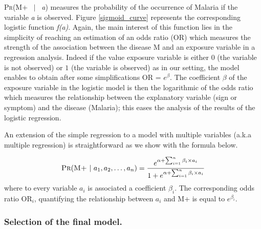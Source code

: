 \textsc{Pr}(\textsc{M+} ~$|$~ \emph{a}) measures the probability of the occurrence of Malaria if the variable \emph{a} is observed.
Figure \ref{sigmoid_curve} represents the corresponding logistic function \emph{f(a)}. Again, the main interest of this function
lies in the simplicity of reaching an estimation of an odds ratio (OR) which measures the strength of the association between the 
disease \textsc{M} and an exposure variable in a regression analysis. Indeed if the value exposure variable is either $0$ (the variable is not observed)
or $1$ (the variable is observed) as in our setting, the model enables to obtain after some simplifications OR = $e^{\beta}$. The coefficient $\beta$ 
of the exposure variable in the logistic model is then the logarithmic of the odds ratio which measures the relationship between the explanatory variable 
(sign or symptom) and the disease (Malaria); this eases the analysis of the results of the logistic regression. 

An extension of the simple regression to a model with multiple variables (a.k.a multiple regression) is straightforward as we show with the formula below.

\begin{equation}
\textsc{Pr}(\textsc{M+} ~|~ \emph{$a_1$},\emph{$a_2$}, \ldots, \emph{$a_n$}) = \frac{e^{\alpha + \sum_{i=1}^{n} \beta_i \times \emph{$a_i$} }}{1 + e^{\alpha + \sum_{i=1}^{n} \beta_i \times \emph{$a_i$} }}
\label{multiple_regression}
\end{equation} 
where to every variable \emph{$a_i$} is associated a coefficient $\beta_i$. The corresponding odds ratio OR$_i$, quantifying the relationship between \emph{$a_i$} and \textsc{M+} is equal to $e^{\beta_i}$.

\subsubsection{Selection of the final model.}  
